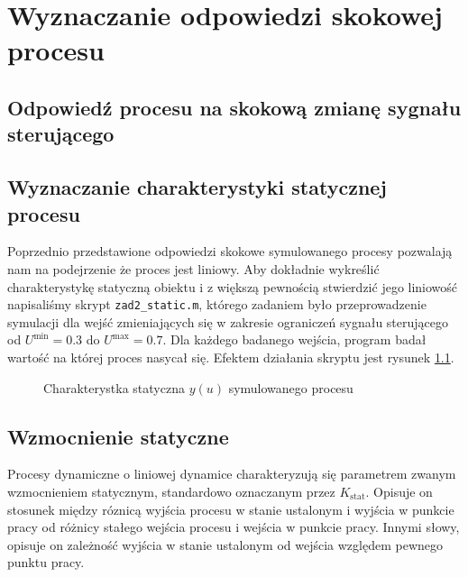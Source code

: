 \chapter{Wyznaczanie odpowiedzi skokowej procesu}
\label{zad2}

\section{Odpowiedź procesu na skokową zmianę sygnału sterującego}
\label{zad2_skoki}



\section{Wyznaczanie charakterystyki statycznej procesu}
\label{zad2_char_stat}
Poprzednio przedstawione odpowiedzi skokowe symulowanego procesy pozwalają nam
na podejrzenie że proces jest liniowy. Aby dokładnie wykreślić charakterystykę statyczną 
obiektu i z większą pewnością stwierdzić jego liniowość napisaliśmy skrypt \verb+zad2_static.m+,
którego zadaniem było przeprowadzenie symulacji dla wejść zmieniających się w zakresie ograniczeń
sygnału sterującego od $U^{\mathrm{min}} = \num{0.3}$ do $U^{\mathrm{max}} = \num{0.7}$. Dla każdego 
badanego wejścia, program badał wartość na której proces nasycał się. Efektem działania skryptu
jest rysunek \ref{zad2_stat_wykres}. 

\begin{figure}[b]
    \centering
    \caption{Charakterystka statyczna $y(u)$ symulowanego procesu}
    \label{zad2_stat_wykres}
\end{figure}

\section{Wzmocnienie statyczne}
\label{zad2_wzmocnienie}
Procesy dynamiczne o liniowej dynamice charakteryzują się 
parametrem zwanym wzmocnieniem statycznym, 
standardowo oznaczanym przez $K_{\mathrm{stat}}$.
Opisuje on stosunek między róznicą wyjścia procesu w stanie ustalonym i wyjścia w punkcie pracy
od różnicy stałego wejścia procesu i wejścia w punkcie pracy. Innymi słowy, opisuje on zależność
wyjścia w stanie ustalonym od wejścia względem pewnego punktu pracy.

